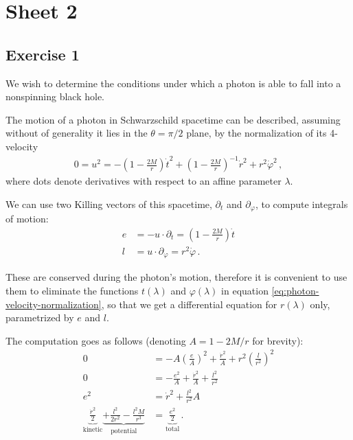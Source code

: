 \documentclass[main.tex]{subfiles}
\begin{document}
\section*{Sheet 2}

\subsection{Exercise 1}

We wish to determine the conditions under which a photon is able to fall into a nonspinning black hole.

The motion of a photon in Schwarzschild spacetime can be described, 
assuming without of generality it lies in the \(\theta = \pi / 2\) plane, 
by the normalization of its 4-velocity %
\begin{align} \label{eq:photon-velocity-normalization}
0 = u^2 = - \left(1 - \frac{2M}{r}\right) \dot{t}^2 + \left(1 - \frac{2M}{r}\right)^{-1} \dot{r}^2 + r^2 \dot{\varphi}^2
\,,
\end{align}
%
where dots denote derivatives with respect to an affine parameter \(\lambda\). 

We can use two Killing vectors of this spacetime, \(\partial_t\) and \(\partial_\varphi\), 
to compute integrals of motion: %
\begin{align}
e &= - u \cdot \partial_t = \left(1 - \frac{2M}{r}\right) \dot{t}  \\
l &= u \cdot \partial_\varphi = r^2 \dot{\varphi}
\,.
\end{align}

These are conserved during the photon's motion, therefore it is convenient to use them to 
eliminate the functions \(t(\lambda )\) and \(\varphi (\lambda )\) in equation \eqref{eq:photon-velocity-normalization}, 
so that we get a differential equation for \(r(\lambda )\) only, parametrized by \(e\) and \(l\).

The computation goes as follows (denoting \(A =1 - 2M/r\) for brevity): 
%
\begin{align}
0 &= - A \left( \frac{e}{A}\right)^2 + \frac{\dot{r}^2}{A} + r^2 \left( \frac{l}{r^2}\right)^2   \\
0 &= - \frac{e^2}{A} + \frac{\dot{r}^2}{A} + \frac{l^2}{r^2}  \\
e^2 &= \dot{r}^2 + \frac{l^2}{r^2} A \\
\underbrace{\frac{\dot{r}^2}{2}}_{\text{kinetic}} 
\underbrace{+ \frac{l^2}{2r^2} - \frac{l^2M}{r^3}}_{\text{potential}} &= \underbrace{\frac{e^2}{2}}_{\text{total}} \label{eq:photon-trajectory-schwarzschild}
\,.
\end{align}
\end{document}
